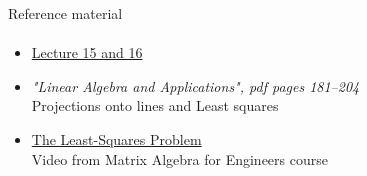 \documentclass[aspectratio=169]{beamer}
\newcommand{\fbckg}[1]{\usebackgroundtemplate{\texttt{[image: \#1]}}}%
\begin{document}
\begin{frame}[t]{Reference material}
    \framesubtitle{}
    \Large
    \begin{itemize}
        \item \href{https://www.youtube.com/watch?v=Y_Ac6KiQ1t0&list=PL49CF3715CB9EF31D&index=15}{Lecture 15 and 16}
        \item \textit{"Linear Algebra and Applications", pdf pages 181--204 }\\ Projections onto lines and Least squares
        \item \href{https://www.coursera.org/lecture/matrix-algebra-engineers/the-least-squares-problem-I56Qy}{The Least-Squares Problem}\\ Video from Matrix Algebra for Engineers course
    \end{itemize}
\end{frame}

\usebackgroundtemplate{}
% 

\fbckg{fibeamer/figs/last_page.png}
\frame[plain]{}
\end{document}

